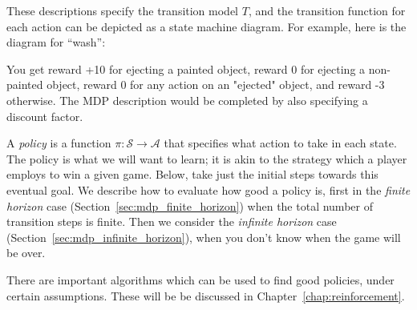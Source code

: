 \begin{examplebox}
\noindent
These descriptions specify the transition model $T$, and the
transition function for each action can be depicted as a state machine
diagram.  For example, here is the diagram for ``wash'':
%
%
\begin{center}
\end{center}

You get reward +10 for ejecting a painted object, reward 0 for
ejecting a non-painted object, reward 0 for any action on an "ejected"
object, and reward -3 otherwise.  The MDP description would be
completed by also specifying a discount factor.

\end{examplebox}



A {\it{policy}} is a function $\pi: \mathcal S \rightarrow \mathcal A$
that specifies what action to take in each state.  The policy is what
we will want to learn; it is akin to the strategy which a player
employs to win a given game.  Below, take just the initial steps
towards this eventual goal.  We describe how to evaluate how good a
policy is, first in the {\em finite horizon}  case
(Section~\ref{sec:mdp_finite_horizon}) when the total number of
transition steps is finite.  Then we consider the {\em infinite horizon} 
case (Section~\ref{sec:mdp_infinite_horizon}), when you
don't know when the game will be over.

There are important algorithms which can be used to find good
policies, under certain assumptions.  These will be be discussed in
Chapter~\ref{chap:reinforcement}.

